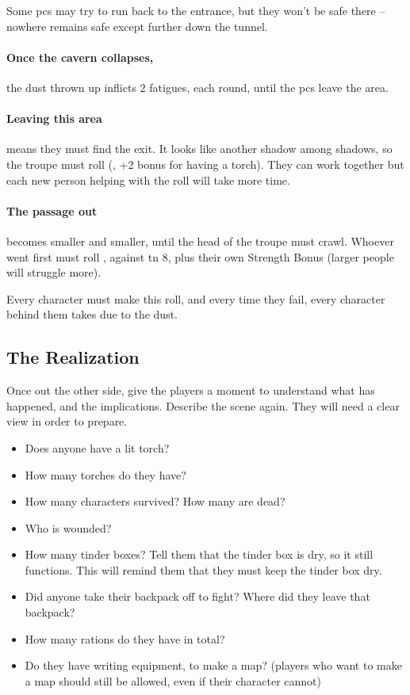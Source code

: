 \begin{multicols}{2}
\caveIn

Some \glspl{pc} may try to run back to the entrance, but they won't be safe there -- nowhere remains safe except further down the tunnel.

\paragraph{Once the cavern collapses,}
the dust thrown up inflicts 2 \glspl{fatigue}, each round, until the \glspl{pc} leave the \gls{area}.

\paragraph{Leaving this area}
means they must find the exit.
It looks like another shadow among shadows, so the troupe must roll  (\tn[10], +2 bonus for having a torch).
They can work together%
but each new person helping with the roll will take more time.

\paragraph{The passage out}
becomes smaller and smaller, until the head of the troupe must crawl.
Whoever went first must roll , against \gls{tn} 8, plus their own Strength Bonus (larger people will struggle more).

Every character must make this roll, and every time they fail, every character behind them takes  due to the dust.

\subsection{The Realization}

Once out the other side, give the players a moment to understand what has happened, and the implications.
Describe the scene again.
They will need a clear view in order to prepare.

\begin{itemize}
  \item
  Does anyone have a lit torch?
  \item
  How many torches do they have?
  \item
  How many characters survived?
  How many are dead?
  \item
  Who is wounded?
  \item
  How many tinder boxes?
  Tell them that the tinder box is dry, so it still functions.
  This will remind them that they must keep the tinder box dry.
  \item
  Did anyone take their backpack off to fight?
  Where did they leave that backpack?
  \item
  How many rations do they have in total?
  \item
  Do they have writing equipment, to make a map?
  (players who want to make a map should still be allowed, even if their character cannot)
\end{itemize}


\end{multicols}
